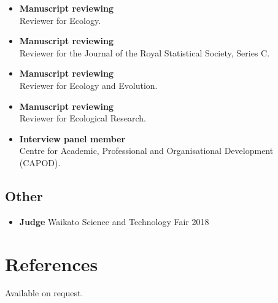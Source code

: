 \documentclass[10pt,a4paper]{moderncv}
\begin{document}
\begin{itemize}
  \item \textbf{Manuscript reviewing}\\
Reviewer for Ecology.
 \item \textbf{Manuscript reviewing}\\
Reviewer for the Journal of the Royal Statistical Society, Series C.
 \item \textbf{Manuscript reviewing}\\
   Reviewer for Ecology and Evolution.
   \item \textbf{Manuscript reviewing}\\
Reviewer for Ecological Research.
\item \textbf{Interview panel member}\\
 Centre for Academic, Professional and Organisational Development (CAPOD).
\end{itemize}

\subsection{Other}

\vspace{5pt}

\begin{itemize}
\item \textbf{Judge} Waikato Science and Technology Fair 2018
\end{itemize}


\section{References}

Available on request.           

 







 
\end{document}
